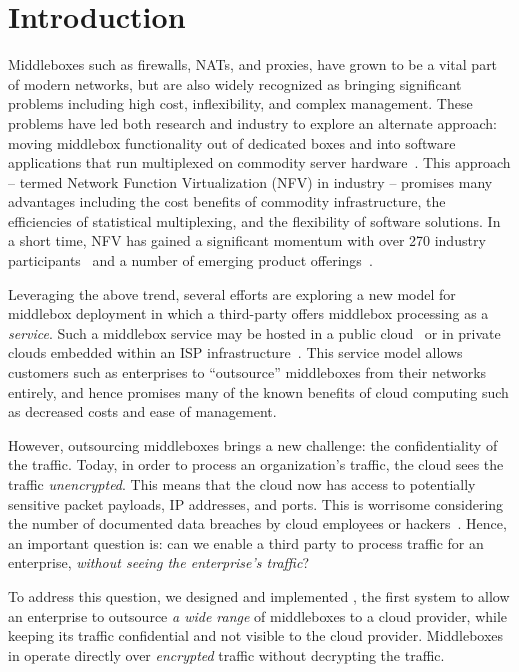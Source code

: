 
\section{Introduction}\label{sec:intro}

Middleboxes such as firewalls, NATs, and proxies, have grown to be a vital part of modern networks, but are 
also widely recognized as bringing significant problems including high cost, inflexibility, and complex management.  
These problems have led both research and industry to explore an alternate approach: moving middlebox functionality out of dedicated boxes and into 
software applications that run multiplexed on commodity server hardware~\cite{mb-manifesto,comb,aplomb,opennf,clickos,flowtags,etsi-nfv,domain20,opnfv}.
This approach -- termed Network Function Virtualization (NFV) in industry -- promises many advantages including the cost benefits of commodity infrastructure, 
the efficiencies of statistical multiplexing, and the flexibility of software solutions. 
In a short time, NFV has gained a significant momentum with over 270 industry participants~\cite{etsi-nfv} and a number of emerging product offerings~\cite{brocade,dell,juniper}.

Leveraging the above trend, several efforts are exploring a new model for middlebox deployment in which a third-party offers middlebox processing as a  
\emph{service}.
Such a middlebox service may be hosted in a public cloud~\cite{aplomb,zscaler,aryaka} or in private clouds embedded within an ISP 
infrastructure~\cite{domain20, telefonica}.  
This service model allows customers such as enterprises to ``outsource'' middleboxes from their networks entirely, and hence promises many of the known benefits of cloud computing  such as decreased costs and ease of management.%

However, outsourcing middleboxes brings a new challenge: the confidentiality of the traffic. 
Today, in order to process an organization's traffic, the cloud sees the traffic {\em unencrypted}.  This means that the cloud 
now has access to potentially sensitive packet payloads,  IP addresses, and ports. This is 
worrisome considering the number of documented data breaches by cloud employees or hackers~\cite{PrivacyRecords}.
Hence, an important question is: can we enable a third party to process traffic for an enterprise, {\em without seeing the enterprise's traffic}?

To address this question, we designed and implemented \sys, the first system to allow an enterprise to outsource {\it a wide range} of middleboxes  to a cloud provider, while keeping its traffic confidential and not visible to the cloud provider. 
Middleboxes in \sys operate directly over {\it encrypted} traffic without decrypting the traffic. 


